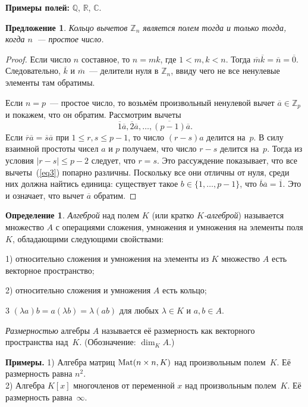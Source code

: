 \documentclass[a4paper,10pt]{amsart}
\def\Mat{{\rm Mat}}%
\def\CC{{\mathbb C}}%
\def\ZZ{{\mathbb Z}}%
\def\RR{{\mathbb R}}%
\def\QQ{{\mathbb Q}}%
\def\Mat{{\rm Mat}}
\newtheorem{proposition}{Предложение}
\theoremstyle{definition}
\newtheorem{definition}{Определение}
\theoremstyle{remark}
\begin{document}
\textbf{Примеры полей:} $\QQ$, $\RR$, $\CC$.

\begin{proposition}
Кольцо вычетов $\ZZ_n$ является полем тогда и только тогда, когда
$n$~--- простое число.
\end{proposition}

\begin{proof}
Если число $n$ составное, то $n = m k$, где $1 < m, k < n$. Тогда
$\overline{m} \overline{k} = \overline{n} = \overline{0}$.
Следовательно, $\overline k$ и $\overline m$~--- делители нуля в
$\ZZ_n$, ввиду чего не все ненулевые элементы там обратимы.

Если $n = p$~--- простое число, то возьмём произвольный ненулевой
вычет $\overline{a} \in \ZZ_p$ и покажем, что он обратим. Рассмотрим
вычеты
\begin{equation} \label{eq3}
\overline{1} \overline{a}, \overline{2} \overline{a}, \ldots,
\overline{(p-1)} \overline{a}.
\end{equation}
Если $\overline{r} \overline{a} = \overline{s} \overline{a}$ при $1
\leqslant r,s \leqslant p-1$, то число $(r - s)a$ делится на~$p$. В
силу взаимной простоты чисел $a$ и $p$ получаем, что число $r - s$
делится на~$p$. Тогда из условия $|r-s| \leqslant p - 2$ следует,
что $r = s$. Это рассуждение показывает, что все вычеты~(\ref{eq3})
попарно различны. Поскольку все они отличны от нуля, среди них
должна найтись единица: существует такое $b \in \lbrace 1, \ldots,
p-1 \rbrace$, что $\overline{b} \overline{a}=\overline{1}$. Это и
означает, что вычет $\overline{a}$ обратим.
\end{proof}

\begin{definition}
{\it Алгеброй} над полем $K$ (или кратко \textit{$K$-алгеброй})
называется множество $A$ с операциями сложения, умножения и
умножения на элементы поля $K$, обладающими следующими свойствами:

1) относительно сложения и умножения на элементы из $K$ множество
$A$ есть векторное пространство;

2) относительно сложения и умножения $A$ есть кольцо;

3 $(\lambda a)b=a(\lambda b)=\lambda(ab)$ для любых $\lambda\in K$ и
$a,b\in A$.

{\it Размерностью} алгебры $A$ называется её размерность как
векторного пространства над~$K$. (Обозначение: $\dim_K A$.)
\end{definition}

\textbf{Примеры.} 1) Алгебра матриц $\Mat(n\times n, K)$ над
произвольным полем~$K$. Её размерность равна $n^2$. \\
2) Алгебра $K[x]$ многочленов от переменной $x$ над произвольным
полем~$K$. Её размерность равна~$\infty$.
\end{document}
